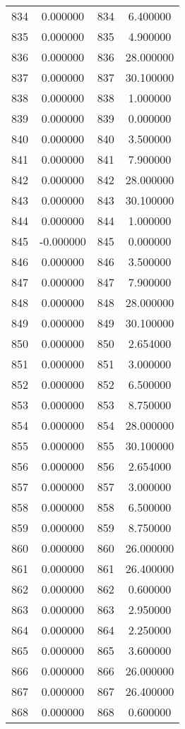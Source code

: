 \documentclass[12pt]{article}
\begin{document}
\begin{longtable}{@{}cccc@{}}
834 & 0.000000 & 834 & 6.400000 \\
835 & 0.000000 & 835 & 4.900000 \\
836 & 0.000000 & 836 & 28.000000 \\
837 & 0.000000 & 837 & 30.100000 \\
838 & 0.000000 & 838 & 1.000000 \\
839 & 0.000000 & 839 & 0.000000 \\
840 & 0.000000 & 840 & 3.500000 \\
841 & 0.000000 & 841 & 7.900000 \\
842 & 0.000000 & 842 & 28.000000 \\
843 & 0.000000 & 843 & 30.100000 \\
844 & 0.000000 & 844 & 1.000000 \\
845 & -0.000000 & 845 & 0.000000 \\
846 & 0.000000 & 846 & 3.500000 \\
847 & 0.000000 & 847 & 7.900000 \\
848 & 0.000000 & 848 & 28.000000 \\
849 & 0.000000 & 849 & 30.100000 \\
850 & 0.000000 & 850 & 2.654000 \\
851 & 0.000000 & 851 & 3.000000 \\
852 & 0.000000 & 852 & 6.500000 \\
853 & 0.000000 & 853 & 8.750000 \\
854 & 0.000000 & 854 & 28.000000 \\
855 & 0.000000 & 855 & 30.100000 \\
856 & 0.000000 & 856 & 2.654000 \\
857 & 0.000000 & 857 & 3.000000 \\
858 & 0.000000 & 858 & 6.500000 \\
859 & 0.000000 & 859 & 8.750000 \\
860 & 0.000000 & 860 & 26.000000 \\
861 & 0.000000 & 861 & 26.400000 \\
862 & 0.000000 & 862 & 0.600000 \\
863 & 0.000000 & 863 & 2.950000 \\
864 & 0.000000 & 864 & 2.250000 \\
865 & 0.000000 & 865 & 3.600000 \\
866 & 0.000000 & 866 & 26.000000 \\
867 & 0.000000 & 867 & 26.400000 \\
868 & 0.000000 & 868 & 0.600000 \\

\end{longtable}
\end{document}
